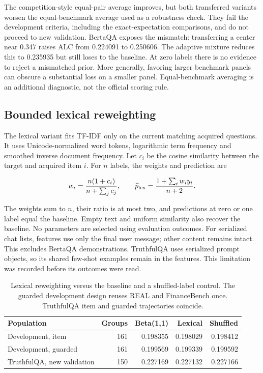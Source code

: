 \documentclass{article}
\begin{document}
The competition-style equal-pair average improves, but both transferred variants worsen the equal-benchmark average used as a robustness check. They fail the development criteria, including the exact-expectation comparisons, and do not proceed to new validation. BertaQA exposes the mismatch: transferring a center near 0.347 raises ALC from 0.224091 to 0.250606. The adaptive mixture reduces this to 0.235935 but still loses to the baseline. At zero labels there is no evidence to reject a mismatched prior. More generally, favoring larger benchmark panels can obscure a substantial loss on a smaller panel. Equal-benchmark averaging is an additional diagnostic, not the official scoring rule.

\clearpage
\subsection{Bounded lexical reweighting}\label{bounded-lexical-reweighting}

The lexical variant fits TF-IDF only on the current matching acquired questions. It uses Unicode-normalized word tokens, logarithmic term frequency and smoothed inverse document frequency. Let \(c_i\) be the cosine similarity between the target and acquired item \(i\). For \(n\) labels, the weights and prediction are

\begin{equation}
w_i=\frac{n(1+c_i)}{n+\sum_j c_j},\qquad
\widehat p_{\rm lex}=\frac{1+\sum_i w_i y_i}{n+2}.
\end{equation}

The weights sum to \(n\), their ratio is at most two, and predictions at zero or one label equal the baseline. Empty text and uniform similarity also recover the baseline. No parameters are selected using evaluation outcomes. For serialized chat lists, features use only the final user message; other content remains intact. This excludes BertaQA demonstrations. TruthfulQA uses serialized prompt objects, so its shared few-shot examples remain in the features. This limitation was recorded before its outcomes were read.

\begin{table}[ht]
\centering
\caption{Lexical reweighting versus the baseline and a shuffled-label control. The guarded development design reuses REAL and FinanceBench once. TruthfulQA item and guarded trajectories coincide.}
\label{tab:retrieval}
\small
\begin{tabular}{lrrrr}
\toprule
Population & Groups & Beta(1,1) & Lexical & Shuffled \\
\midrule
Development, item & 161 & 0.198355 & 0.198029 & 0.198412 \\
Development, guarded & 161 & 0.199569 & 0.199339 & 0.199592 \\
TruthfulQA, new validation & 150 & 0.227169 & 0.227132 & 0.227166 \\
\bottomrule
\end{tabular}
\end{table}
\end{document}

